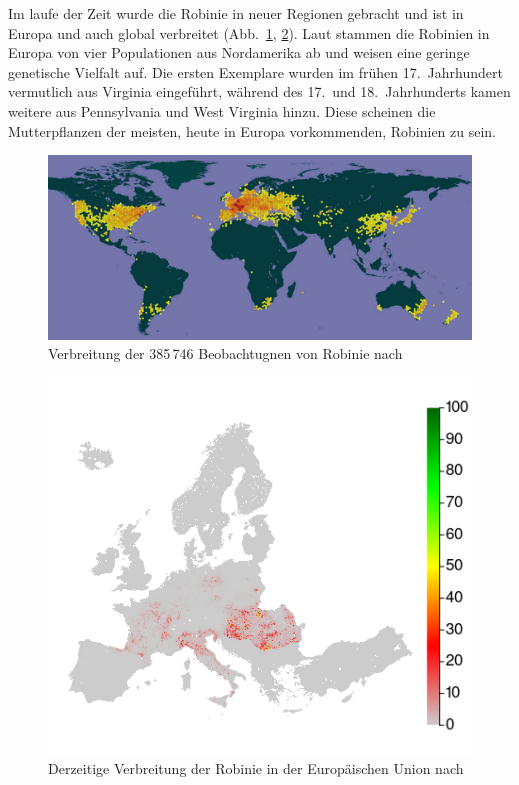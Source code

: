 \documentclass[twocolumn]{scrartcl}
\begin{document}
Im laufe der Zeit wurde die Robinie in neuer Regionen gebracht und ist in Europa
und auch global verbreitet (Abb.~\ref{fig:verbreitungGlob},
\ref{fig:verbreitungEuJetzt}). Laut \citet{bouteiller2019robinie} stammen die
Robinien in Europa von vier Populationen aus Nordamerika ab und weisen eine
geringe genetische Vielfalt auf. Die ersten Exemplare wurden im frühen 17.\
Jahrhundert vermutlich aus Virginia eingeführt, während des 17.\ und 18.\
Jahrhunderts kamen weitere aus Pennsylvania und West Virginia hinzu. Diese
scheinen die Mutterpflanzen der meisten, heute in Europa vorkommenden, Robinien
zu sein.

\begin{figure}[htbp]
  \centering
  \includegraphics[width=.9\linewidth]{./bild/verbreitungRobGlob}
  \caption{Verbreitung der 385\,746 Beobachtugnen von Robinie nach \citet{gbifRob}}
  \label{fig:verbreitungGlob}
\end{figure}

\begin{figure}[htbp]
  \centering
  \includegraphics[width=.9\linewidth]{./bild/verbreitungEuropa}
  \caption{Derzeitige Verbreitung der Robinie in der Europäischen Union nach \citet{jrc2016treeAtlas}}
  \label{fig:verbreitungEuJetzt}
\end{figure}
\end{document}
